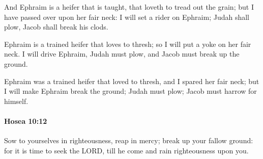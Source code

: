			\begin{versebox}
					\item[BHS] 
					\item[LXX] 
					\item[ASV] And Ephraim is a heifer that is taught, that loveth to tread out the grain; but I have passed over upon her fair neck: I will set a rider on Ephraim; Judah shall plow, Jacob shall break his clods.
					\item[NIV] Ephraim is a trained heifer that loves to thresh; so I will put a yoke on her fair neck. I will drive Ephraim, Judah must plow, and Jacob must break up the ground.
					\item[NRSV] Ephraim was a trained heifer that loved to thresh, and I spared her fair neck; but I will make Ephraim break the ground; Judah must plow; Jacob must harrow for himself.
			\end{versebox}

		\paragraph{Hosea 10:12} %
			\label{HOSEA-10-12}

			Sow to yourselves in righteousness, reap in mercy; break up your fallow ground: for it is time to seek the LORD, till he come and rain righteousness upon you.

